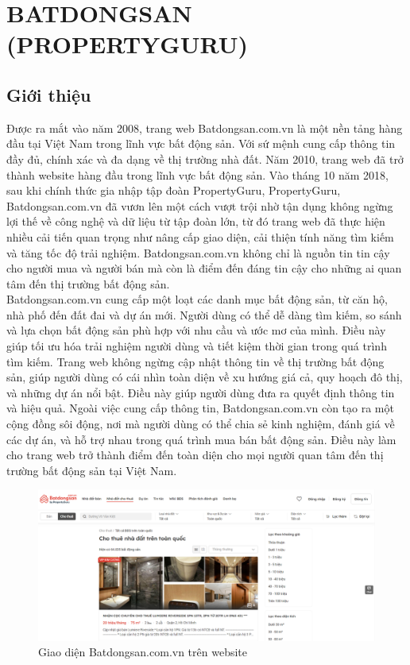 \section{BATDONGSAN (PROPERTYGURU)}
\subsection{Giới thiệu}
\hspace*{1cm}Được ra mắt vào năm 2008, trang web Batdongsan.com.vn là một nền tảng hàng đầu tại Việt Nam trong lĩnh vực bất động sản. Với sứ mệnh cung cấp thông tin đầy đủ, chính xác và đa dạng về thị trường nhà đất. Năm 2010, trang web đã trở thành website hàng đầu trong lĩnh vực bất động sản. Vào tháng 10 năm 2018, sau khi chính thức gia nhập tập đoàn PropertyGuru,  PropertyGuru, Batdongsan.com.vn đã vươn lên một cách vượt trội nhờ tận dụng không ngừng lợi thế về công nghệ và dữ liệu từ tập đoàn lớn, từ đó trang web đã thực hiện nhiều cải tiến quan trọng như nâng cấp giao diện, cải thiện tính năng tìm kiếm và tăng tốc độ trải nghiệm. \cite{batdongsan} Batdongsan.com.vn không chỉ là nguồn tin tin cậy cho người mua và người bán mà còn là điểm đến đáng tin cậy cho những ai quan tâm đến thị trường bất động sản.\\
\hspace*{1cm}Batdongsan.com.vn cung cấp một loạt các danh mục bất động sản, từ căn hộ, nhà phố đến đất đai và dự án mới. Người dùng có thể dễ dàng tìm kiếm, so sánh và lựa chọn bất động sản phù hợp với nhu cầu và ước mơ của mình. Điều này giúp tối ưu hóa trải nghiệm người dùng và tiết kiệm thời gian trong quá trình tìm kiếm. Trang web không ngừng cập nhật thông tin về thị trường bất động sản, giúp người dùng có cái nhìn toàn diện về xu hướng giá cả, quy hoạch đô thị, và những dự án nổi bật. Điều này giúp người dùng đưa ra quyết định thông tin và hiệu quả. Ngoài việc cung cấp thông tin, Batdongsan.com.vn còn tạo ra một cộng đồng sôi động, nơi mà người dùng có thể chia sẻ kinh nghiệm, đánh giá về các dự án, và hỗ trợ nhau trong quá trình mua bán bất động sản. Điều này làm cho trang web trở thành điểm đến toàn diện cho mọi người quan tâm đến thị trường bất động sản tại Việt Nam.
\begin{figure}[H]
    \centering
    \includegraphics[width=1\textwidth]{Images/RelatedSystems/BatdongsanDesktop.png}
    \caption{Giao diện Batdongsan.com.vn trên website}
\end{figure}
